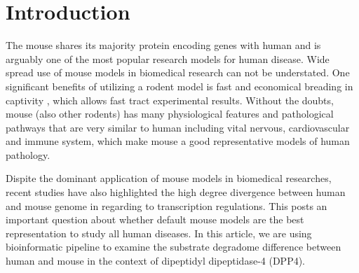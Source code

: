 \section{Introduction}

The mouse shares its majority protein encoding genes with human and is arguably one of the most popular research models for human disease. Wide spread use of mouse models in biomedical research can not be understated. \cite{MORSEIII_2007} One significant benefits of utilizing a rodent model is fast and economical breading in captivity \cite{Rosenthal_2007}, which allows fast tract experimental results. \cite{Vandamme_2014} Without the doubts, mouse (also other rodents) has many physiological features and pathological pathways that are very similar to human including vital nervous, cardiovascular and immune system, which make mouse a good representative models of human pathology. \cite{MORSEIII_2007,Rosenthal_2007}

Dispite the dominant application of mouse models in biomedical researches, recent studies have also highlighted the high degree divergence between human and mouse genome in regarding to transcription regulations. \cite{25409824} This posts an important question about whether default mouse models are the best representation to study all human diseases. In this article, we are using bioinformatic pipeline to examine the substrate degradome difference between human and mouse in the context of dipeptidyl dipeptidase-4 (DPP4).  


\cite{Justice_2011}